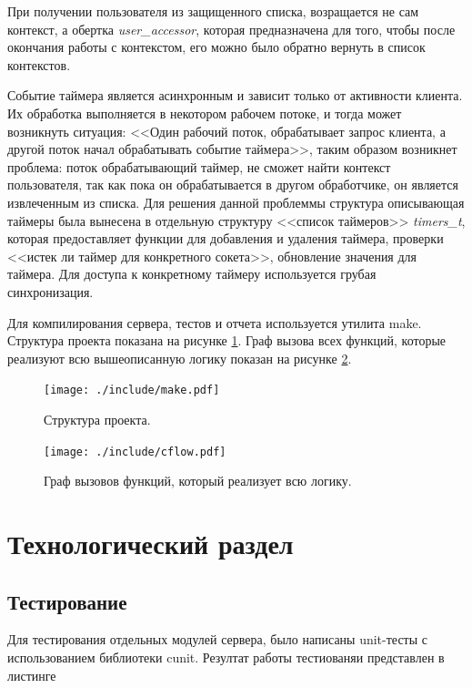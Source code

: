 \documentclass[a4paper,12pt]{report}
\begin{document}
	При получении пользователя из защищенного списка, возращается не сам контекст, а обертка \textit{user\_accessor}, которая предназначена для того, чтобы после окончания работы с контекстом, его можно было обратно вернуть в список контекстов. 

	Событие таймера является асинхронным и зависит только от активности клиента. Их обработка выполняется в некотором рабочем потоке, и тогда может возникнуть ситуация: <<Один рабочий поток, обрабатывает запрос клиента, а другой поток начал обрабатывать событие таймера>>, таким образом возникнет проблема: поток обрабатывающий таймер, не сможет найти контекст пользователя, так как пока он обрабатывается в другом обработчике, он является извлеченным из списка. Для решения данной проблеммы структура описывающая таймеры была вынесена в отдельную структуру <<список таймеров>> \textit{timers\_t}, которая предоставляет функции для добавления и удаления таймера, проверки <<истек ли таймер для конкретного сокета>>, обновление значения для таймера. Для доступа к конкретному таймеру используется грубая синхронизация.

	Для компилирования сервера, тестов и отчета используется утилита make. Структура проекта показана на рисунке \ref{fig:make_server}. Граф вызова всех функций, которые реализуют всю вышеописанную логику показан на рисунке \ref{fig:cflow}.

	\begin{figure}[H]
	\centering
	\texttt{[image: ./include/make.pdf]}
	\caption{Структура проекта.}
	\label{fig:make_server}
	\end{figure}

	
	\begin{figure}[H]
	\centering
	\texttt{[image: ./include/cflow.pdf]}
	\caption{Граф вызовов функций, который реализует всю логику.}
	\label{fig:cflow}
	\end{figure}


 \chapter{Технологический раздел}

	\section{Тестирование}
		Для тестирования отдельных модулей сервера, было написаны unit-тесты
		с использованием библиотеки cunit. Резултат работы тестиованяи представлен
		в листинге 
		
\end{document}
